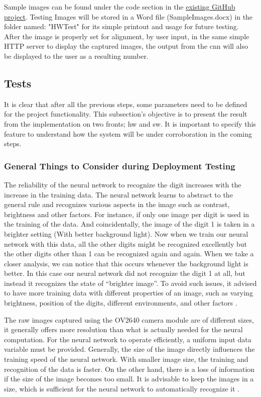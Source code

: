 Sample images can be found under the code section in the \href{https://github.com/jomjol/ctmake-KI-ESP32-Teil2}{existing GitHub project}. Testing Images will be stored in a Word file (SampleImages.docx) in the folder named: "HWTest" for its simple printout and usage for future testing. After the image is properly set for alignment, by user input, in the same simple HTTP server to display the captured images, the output from the \ac{cnn} will also be displayed to the user as a resulting number.

\subsection{Tests}
It is clear that after all the previous steps, some parameters need to be defined for the project functionality. This subsection's objective is to present the result from the implementation on two fronts; \ac{hw} and \ac{sw}. It is important to specify this feature to understand how the system will be under corroboration in the coming steps.


\subsubsection{General Things to Consider during Deployment Testing}

The reliability of the neural network to recognize the digit increases with the increase in the training data. The neural network learns to abstract to the general rule and recognizes various aspects in the image such as contrast, brightness and other factors. For instance, if only one image per digit is used in the training of the data. And coincidentally, the image of the digit 1 is taken in a brighter setting (With better background light). Now when we train our neural network with this data, all the other digits might be recognized excellently but the other digits other than 1 can be recognized again and again. When we take a closer analysis, we can notice that this occurs whenever the background light is better. In this case our neural network did not recognize the digit 1 at all, but instead it recognizes the state of “brighter image”. To avoid such issues, it advised to have more training data with different properties of an image, such as varying brightness, position of the digits, different environments, and other factors \cite{Mueller:2022Part2}.

The raw images captured using the OV2640 camera module are of different sizes, it generally offers more resolution than what is actually needed for the neural computation. For the neural network to operate efficiently, a uniform input data variable must be provided. Generally, the size of the image directly influences the training speed of the neural network. With smaller image size, the training and recognition of the data is faster. On the other hand, there is a loss of information if the size of the image becomes too small. It is advisable to keep the images in a size, which is sufficient for the neural network to automatically recognize it \cite{Mueller:2022Part2,Schmidt:2019}.

